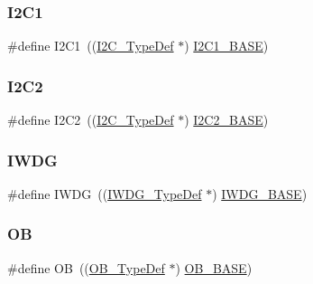 \subsubsection{\texorpdfstring{I2C1}{I2C1}}
{\footnotesize\ttfamily \#define I2\+C1~((\mbox{\hyperlink{struct_i2_c___type_def}{I2\+C\+\_\+\+Type\+Def}} $\ast$) \mbox{\hyperlink{group___peripheral__memory__map_gacd72dbffb1738ca87c838545c4eb85a3}{I2\+C1\+\_\+\+B\+A\+SE}})}

\mbox{\label{group___peripheral__declaration_gafa60ac20c1921ef1002083bb3e1f5d16}} 
\subsubsection{\texorpdfstring{I2C2}{I2C2}}
{\footnotesize\ttfamily \#define I2\+C2~((\mbox{\hyperlink{struct_i2_c___type_def}{I2\+C\+\_\+\+Type\+Def}} $\ast$) \mbox{\hyperlink{group___peripheral__memory__map_ga04bda70f25c795fb79f163b633ad4a5d}{I2\+C2\+\_\+\+B\+A\+SE}})}

\mbox{\label{group___peripheral__declaration_gad16b79dd94ee85d261d08a8ee94187e7}} 
\subsubsection{\texorpdfstring{IWDG}{IWDG}}
{\footnotesize\ttfamily \#define I\+W\+DG~((\mbox{\hyperlink{struct_i_w_d_g___type_def}{I\+W\+D\+G\+\_\+\+Type\+Def}} $\ast$) \mbox{\hyperlink{group___peripheral__memory__map_ga8543ee4997296af5536b007cd4748f55}{I\+W\+D\+G\+\_\+\+B\+A\+SE}})}

\mbox{\label{group___peripheral__declaration_gad2d5f875cdc6d696735f20fa23a895c3}} 
\subsubsection{\texorpdfstring{OB}{OB}}
{\footnotesize\ttfamily \#define OB~((\mbox{\hyperlink{struct_o_b___type_def}{O\+B\+\_\+\+Type\+Def}} $\ast$) \mbox{\hyperlink{group___peripheral__memory__map_gab5b5fb155f9ee15dfb6d757da1adc926}{O\+B\+\_\+\+B\+A\+SE}})}

